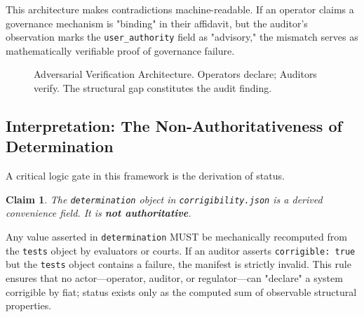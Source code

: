 \documentclass{article}
\newtheorem{claim}{Claim}
\begin{document}
This architecture makes contradictions machine-readable. If an operator claims a governance mechanism is "binding" in their affidavit, but the auditor's observation marks the \texttt{user\_authority} field as "advisory," the mismatch serves as mathematically verifiable proof of governance failure.

\begin{figure}[htbp]
\centering
{}
\caption{Adversarial Verification Architecture. Operators declare; Auditors verify. The structural gap constitutes the audit finding.}
\label{fig:manifests}
\end{figure}

\subsection{Interpretation: The Non-Authoritativeness of Determination}

A critical logic gate in this framework is the derivation of status.

\begin{claim}
The \texttt{determination} object in \texttt{corrigibility.json} is a derived convenience field. It is \textbf{not authoritative}.
\end{claim}

Any value asserted in \texttt{determination} MUST be mechanically recomputed from the \texttt{tests} object by evaluators or courts. If an auditor asserts \texttt{corrigible: true} but the \texttt{tests} object contains a failure, the manifest is strictly invalid. This rule ensures that no actor---operator, auditor, or regulator---can "declare" a system corrigible by fiat; status exists only as the computed sum of observable structural properties.
\end{document}
